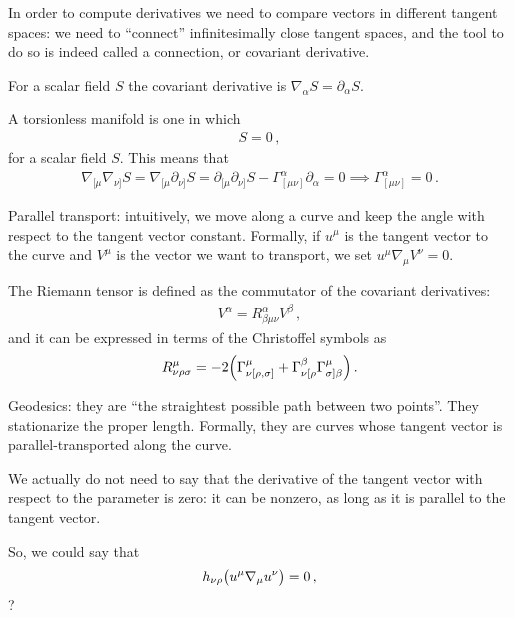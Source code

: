 \documentclass[main.tex]{subfiles}
\begin{document}
In order to compute derivatives we need to compare vectors in different tangent spaces: we need to ``connect'' infinitesimally close tangent spaces, and the tool to do so is indeed called a connection, or covariant derivative. 

For a scalar field \(S\) the covariant derivative is \(\nabla_{\alpha } S = \partial_{\alpha } S\). 

A torsionless manifold is one in which 
%
\begin{align}
[\nabla_{\mu }, \nabla_{\nu }] S = 0
\,,
\end{align}
%
for a scalar field \(S\). 
This means that 
%
\begin{align}
\nabla_{[\mu  } \nabla_{\nu ]} S = \nabla_{[\mu  } \partial_{\nu ]} S = \partial_{[\mu } \partial_{\nu ]} S - \Gamma^{\alpha }_{[\mu \nu ]} \partial_{\alpha } = 0
\implies \Gamma^{\alpha }_{[\mu \nu ]} = 0
\,.
\end{align}
%


Parallel transport: intuitively, we move along a curve and keep the angle with respect to the tangent vector constant. 
Formally, if \(u^{\mu }\) is the tangent vector to the curve and \(V^{\mu }\) is the vector we want to transport, we set \(u^{\mu } \nabla_{\mu } V^{\nu }= 0\). 

The Riemann tensor is defined as the commutator of the covariant derivatives:
%
\begin{align}
[\nabla_{\mu }, \nabla_{\nu }] V^{\alpha } = R^{\alpha }_{\beta \mu \nu } V^{\beta }
\,,
\end{align}
%
and it can be expressed in terms of the Christoffel symbols as 
%
\begin{align}
R^{\mu }_{\nu \rho \sigma } = -2 \qty(\Gamma^{\mu }_{\nu [\rho , \sigma ]} + \Gamma^{\beta }_{\nu [\rho } \Gamma^{\mu }_{\sigma ] \beta })
\,.
\end{align}

Geodesics: they are ``the straightest possible path between two points''.
They stationarize the proper length.
Formally, they are curves whose tangent vector is parallel-transported along the curve. 

We actually do not need to say that the derivative of the tangent vector with respect to the parameter is zero: it can be nonzero, as long as it is parallel to the tangent vector. 

So, we could say that 
%
\begin{align}
h_{\nu \rho } \qty(u^{\mu } \nabla_{\mu } u^{\nu }) =0
\,,
\end{align}
%
?
\end{document}
